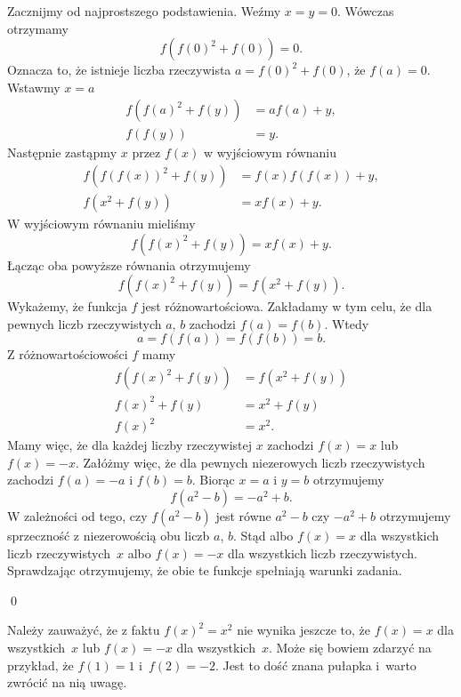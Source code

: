 \noindent
Zacznijmy od najprostszego podstawienia. Weźmy $x = y = 0$. Wówczas otrzymamy
\[
	f(f(0)^2 + f(0)) = 0.
\]
Oznacza to, że istnieje  liczba rzeczywista $a = f(0)^2 + f(0)$, że $f(a) = 0$. Wstawmy $x = a$
\begin{align*}
	f(f(a)^2 + f(y)) &= af(a) + y, \\
	f(f(y)) &= y.
\end{align*}
Następnie zastąpmy $x$ przez $f(x)$ w wyjściowym równaniu
\begin{align*}
	f(f(f(x))^2 + f(y)) &= f(x)f(f(x)) + y, \\
	f(x^2 + f(y)) &= xf(x) + y.
\end{align*}
W wyjściowym równaniu mieliśmy
\[
	f(f(x)^2 + f(y)) = xf(x) + y.
\]
Łącząc oba powyższe równania otrzymujemy
\[
	f(f(x)^2 + f(y)) = f(x^2 + f(y)).
\]
Wykażemy, że funkcja $f$ jest różnowartościowa. Zakładamy w tym celu, że dla pewnych liczb rzeczywistych $a$, $b$ zachodzi $f(a) = f(b)$. Wtedy
\[
	a = f(f(a)) = f(f(b)) = b.
\]
Z różnowartościowości $f$ mamy
\begin{align*}
	f(f(x)^2 + f(y)) &= f(x^2 + f(y)) \\
	f(x)^2 + f(y) &= x^2 + f(y) \\
	f(x)^2 &= x^2.
\end{align*}
Mamy więc, że dla każdej liczby rzeczywistej $x$ zachodzi $f(x) = x$ lub $f(x) = -x$. Załóżmy więc, że dla pewnych niezerowych liczb rzeczywistych zachodzi $f(a) = -a$ i $f(b) = b$. Biorąc $x = a$ i $y = b$ otrzymujemy
\[
	f(a^2 - b) = -a^2 + b.
\]
W zależności od tego, czy $f(a^2 - b)$ jest równe $a^2 - b$ czy $-a^2 + b$ otrzymujemy sprzeczność z niezerowością obu liczb $a$, $b$. Stąd albo $f(x) = x$ dla wszystkich liczb rzeczywistych~$x$ albo $f(x) = -x$ dla wszystkich liczb rzeczywistych. Sprawdzając otrzymujemy, że obie te funkcje spełniają warunki zadania.

\qed

\vspace{10px}
\noindent
Należy zauważyć, że z faktu $f(x)^2 = x^2$ nie wynika jeszcze to, że $f(x) = x$ dla wszystkich~$x$ lub $f(x) = -x$ dla wszystkich~$x$. Może się bowiem zdarzyć na przykład, że $f(1) = 1$ i~$f(2) = -2$. Jest to dość znana pułapka i~warto zwrócić na nią uwagę.
